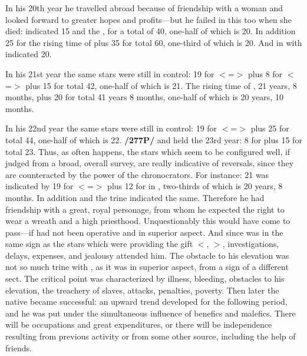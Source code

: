 In his 20th year he travelled abroad because of friendship with
a woman and looked forward to greater hopes and profits—but he failed in this too when she died: \Mars \xspace indicated 15 and the \Moon\xspace 25, for a total of 40, one-half of which is 20. In addition 25 for the rising time of \Taurus\xspace plus 35 for \Leo\xspace total 60, one-third of which is 20. And \Mercury\xspace in \Aries\xspace with \Saturn\xspace indicated 20. 

In his 21st year the same stars were still in control: 19 for \Leo\xspace $<$=\Sun$>$ plus 8 for \Taurus\xspace $<$=\Venus$>$ plus 15 for \Mars\xspace total 42, one-half of which is 21. The rising time of \Aries, 21 years, 8 months, plus 20 for \Mercury\xspace total 41 years 8 months, one-half of which is 20 years, 10 months. 

In his 22nd year the same stars were still in control: 19 for \Leo\xspace $<$=\Sun$>$ plus 25 for \Taurus\xspace total 44, one-half of which is 22. \textbf{/277P/} \Venus\xspace and \Mars\xspace held the 23rd year: 8 for \Venus\xspace plus 15 for \Mars\xspace total 23. Thus, as often happens, the stars which seem to be configured well, if judged from a broad, overall survey, are really indicative of reversals, since they are counteracted by the power of the chronocrators. For instance: 21 was indicated by 19 for \Leo\xspace $<$=\Sun$>$ plus 12 for \Jupiter\xspace in \Leo, two-thirds of which is 20 years, 8 months. In addition \Jupiter\xspace and the \Sun\xspace trine indicated the same. Therefore he had friendship with a great, royal personage, from whom he expected the right to wear a wreath and a high priesthood. Unquestionably this would have come to pass—if \Mars\xspace had not been operative and in superior aspect. And since \Saturn\xspace was in the same sign as the stars which were providing the gift $<$\Sun, \Mercury$>$, investigations, delays, expenses, and jealousy attended him. The obstacle to his elevation was not so much \Saturn\xspace trine with \Jupiter, as it was \Mars\xspace in superior aspect, from a sign of a different sect. The critical point was characterized by illness, bleeding, obstacles to his elevation, the treachery of slaves, attacks, penalties, poverty. Then later the native became successful: an upward trend developed for the
following period, and he was put under the simultaneous influence of benefics and malefics. There will be occupations and great expenditures, or there will be independence resulting from previous activity or from some other source, including the help of friends.

